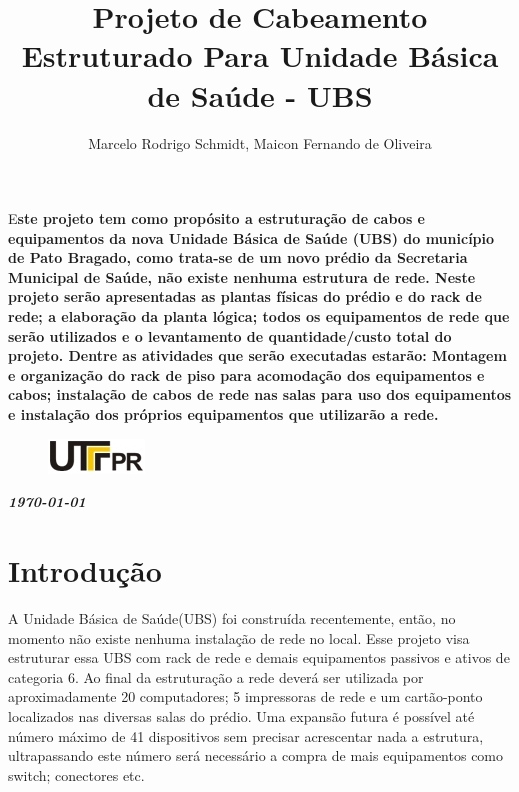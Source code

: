 \documentclass[	DIV=calc,%
							paper=a4,%
							fontsize=12pt,%
							onecolumn]{scrartcl}	 					%
\title{Projeto de Cabeamento Estruturado Para Unidade Básica de Saúde - UBS }					%
\author{Marcelo Rodrigo Schmidt, Maicon Fernando de Oliveira }  	%
\date{}																				%
\newcommand{\initial}[1]{%
     \lettrine[lines=3,lhang=0.3,nindent=0em]{
     				\color{DarkGoldenrod}
     				{\textsf{#1}}}{}}
\begin{document}
\maketitle
\thispagestyle{fancy} 	
\thispagestyle{empty}		%




\initial{E}\textbf{ste projeto tem como propósito a estruturação de cabos e equipamentos da nova Unidade Básica de Saúde (UBS) do município de Pato Bragado, como trata-se de um novo prédio da Secretaria Municipal de Saúde, não existe nenhuma estrutura de rede. Neste projeto serão apresentadas as plantas físicas do prédio e do rack de rede; a elaboração da planta lógica; todos os equipamentos de rede que serão utilizados e o levantamento de quantidade/custo total do projeto. Dentre as atividades que serão executadas estarão: Montagem e organização do rack de piso para acomodação dos equipamentos e cabos; instalação de cabos de rede nas salas para uso dos equipamentos e instalação dos próprios equipamentos que utilizarão a rede.}

\begin{figure}
	\centering
	\includegraphics{utfpr}
\end{figure}

\vspace{2cm}
\centerline{\textit{\textbf{\today}}}

\clearpage
    \renewcommand*\listfigurename{Lista de figuras}
\listoffigures


\clearpage
\renewcommand{\contentsname}{Sumário}
\tableofcontents
\clearpage

\section{Introdução}
A Unidade Básica de Saúde(UBS) foi construída recentemente, então, no momento não existe nenhuma instalação de rede no local. 
Esse projeto visa estruturar essa UBS com rack de rede e demais equipamentos passivos e ativos de categoria 6.
Ao final da estruturação a rede deverá ser utilizada por aproximadamente 20 computadores; 5 impressoras de rede e um cartão-ponto localizados nas diversas salas do prédio. Uma expansão futura é possível até número máximo de 41 dispositivos sem precisar acrescentar nada a estrutura, ultrapassando este número será necessário a compra de mais equipamentos como switch; conectores etc.
\end{document}
